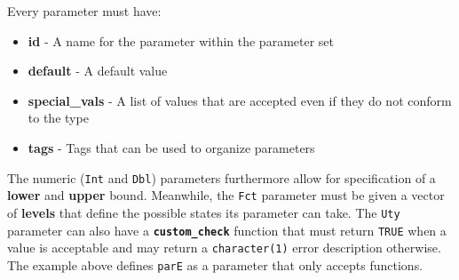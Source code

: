\documentclass[12pt,]{scrbook}
\newenvironment{Shaded}{}{}
\newcommand{\ControlFlowTok}[1]{\textcolor[rgb]{0.00,0.00,1.00}{#1}}
\newcommand{\DataTypeTok}[1]{#1}
\newcommand{\DecValTok}[1]{#1}
\newcommand{\KeywordTok}[1]{\textcolor[rgb]{0.00,0.00,1.00}{#1}}
\newcommand{\NormalTok}[1]{#1}
\newcommand{\OperatorTok}[1]{#1}
\newcommand{\OtherTok}[1]{\textcolor[rgb]{1.00,0.25,0.00}{#1}}
\newcommand{\StringTok}[1]{\textcolor[rgb]{0.00,0.50,0.50}{#1}}
\providecommand{\tightlist}{%
  \setlength{\itemsep}{0pt}\setlength{\parskip}{0pt}}
\begin{document}
\begin{Shaded}
\end{Shaded}

Every parameter must have:

\begin{itemize}
\tightlist
\item
  \textbf{id} - A name for the parameter within the parameter set
\item
  \textbf{default} - A default value
\item
  \textbf{special\_vals} - A list of values that are accepted even if they do not conform to the type
\item
  \textbf{tags} - Tags that can be used to organize parameters
\end{itemize}

The numeric (\texttt{Int} and \texttt{Dbl}) parameters furthermore allow for specification of a \textbf{lower} and \textbf{upper} bound.
Meanwhile, the \texttt{Fct} parameter must be given a vector of \textbf{levels} that define the possible states its parameter can take.
The \texttt{Uty} parameter can also have a \textbf{\texttt{custom\_check}} function that must return \texttt{TRUE} when a value is acceptable and may return a \texttt{character(1)} error description otherwise.
The example above defines \texttt{parE} as a parameter that only accepts functions.
\end{document}
